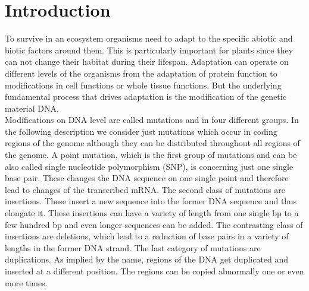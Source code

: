 \chapter{Introduction}
To survive in an ecosystem organisms need to adapt to the specific abiotic and biotic factors around them. This is particularly important for plants since they can not change their habitat during their lifespan. Adaptation can operate on different levels of the organisms from the adaptation of protein function to modifications in cell functions or whole tissue functions. But the underlying fundamental process that drives adaptation is the modification of the genetic material DNA.\\
Modifications on DNA level are called mutations and in four different groups. In the following description we consider just mutations which occur in coding regions of the genome although they can be distributed throughout all regions of the genome. A point mutation, which is the first group of mutations and can be also called single nucleotide polymorphism (SNP), is concerning just one single base pair. These changes the DNA sequence on one single point and therefore lead to changes of the transcribed mRNA. The second class of mutations are insertions. These insert a new sequence into the former DNA sequence and thus elongate it. These insertions can have a variety of length from one single bp to a few hundred bp and even longer sequences can be added.  The contrasting class of insertions are deletions, which lead to a reduction of base pairs in a variety of lengths in the former DNA strand. The last category of mutations are duplications. As implied by the name, regions of the DNA get duplicated and inserted at a different position. The regions can be copied abnormally one or even more times.\\

